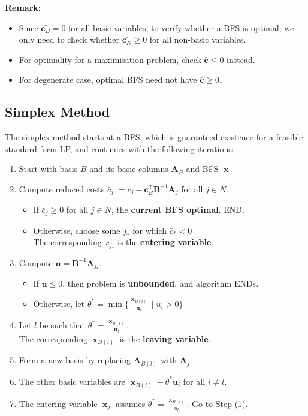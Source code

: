 \documentclass[12pt]{article}
\newcommand{\T}{\mathrm{T}}
\theoremstyle{definition}
\DeclareMathOperator{\x}{\mathbf{x}}
\begin{document}
\textbf{Remark}: 
\begin{itemize}
\item Since $\bar{\mathbf{c}_B}=0$ for all basic variables, to verify whether a BFS is optimal, we only need to check whether $\bar{\mathbf{c}_N}\geq 0$ for all non-basic variables.
\item For optimality for a maximisation problem, check $\bar{\mathbf{c}}\leq 0$ instead.
\item For degenerate case, optimal BFS need not have $\bar{\mathbf{c}}\geq 0$.
\end{itemize} 
\subsection{Simplex Method}
The simplex method starts at a BFS, which is guaranteed existence for a feasible standard form LP, and continues with the following iterations:
\begin{enumerate}
  \item Start with basis $B$ and its basic columns $\mathbf{A}_B$ and BFS $\x$.
  \item Compute reduced costs $\bar{c}_j:=c_j-\mathbf{c}_B^\T\mathbf{B}^{-1}\mathbf{A}_j$ for all $j\in N$.
  \begin{itemize}
    \item If $\bar{c}_j\geq 0$ for all $j\in N$, the \textbf{current BFS optimal}. END.
    \item Otherwise, choose some $j_\ast$ for which $\bar{c}_\ast<0$\\
    The corresponding $x_{j_\ast}$ is the \textbf{entering variable}.
  \end{itemize}
  \item Compute $\mathbf{u}=\mathbf{B}^{-1}\mathbf{A}_{j_\ast}$.
  \begin{itemize}
    \item If $\mathbf{u}\leq 0$, then problem is \textbf{unbounded}, and algorithm ENDs.
    \item Otherwise, let $\theta^\ast = \min\{\frac{\x_{B(i)}}{\mathbf{u}_i}\mid u_i>0\}$
  \end{itemize}
  \item Let $l$ be such that $\theta^\ast = \frac{\x_{B(l)}}{\mathbf{u}_l}$.\\
  The corresponding $\x_{B(l)}$ is the \textbf{leaving variable}.
  \item Form a new basis by replacing $\mathbf{A}_{B(l)}$ with $\mathbf{A}_j$.
  \item The other basic variables are $\x_{B(i)}-\theta^\ast \mathbf{u}_i$ for all $i\neq l$.
  \item The entering variable $\x_j$ assumes $\theta^\ast = \frac{\x_{B(l)}}{u_l}$. Go to Step (1).
\end{enumerate}
\end{document}
